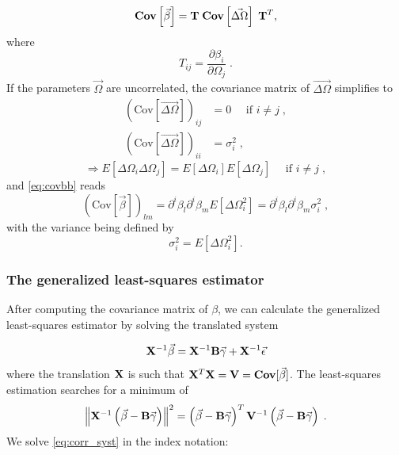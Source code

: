 \begin{equation}\label{key}
\mathbf{Cov}\left[\vec{\beta}\right] = \mathbf{T}\; \mathbf{Cov}\left[\vec{\Delta\Omega}\right] \;\mathbf{T}^T,
\end{equation} where 
\begin{equation}\label{key}
T_{ij} = \frac{\partial \beta_i}{\partial \Omega_j}\;.
\end{equation}
If the parameters $ \vec{\Omega} $ are uncorrelated, the covariance matrix of $\vec{ \Delta\Omega} $ simplifies to
\begin{align}\label{key}
\left(\text{Cov}\left[\vec{\Delta\Omega}\right] \right)_{ij}&= 0 \quad  \text{ if } i\neq j \;,\\
 \left(\text{Cov}\left[\vec{\Delta\Omega}\right] \right)_{ii}&= \sigma_i^2\;,
\end{align} 
\begin{equation}\label{key}
\Rightarrow E\left[\Delta\Omega_i\Delta\Omega_j\right] = E\left[\Delta\Omega_i\right]E\left[\Delta\Omega_j\right]\quad \text{ if } i \neq j\;,
\end{equation}
and \eqref{eq:covbb} reads
\begin{equation}\label{key}
(\text{Cov}[\vec{\beta}])_{lm} = \partial^i\beta_l\partial^i\beta_mE[\Delta\Omega_i^2] = \partial^i\beta_l\partial^i\beta_m \sigma_i^2\;,
\end{equation}
with the variance being defined by
\begin{equation}\label{key}
\sigma_i^2 = E\left[\Delta\Omega_i^2\right].
\end{equation}

\subsubsection{The generalized least-squares estimator}

After computing the covariance matrix of $ \beta $, we can calculate the generalized least-squares estimator by solving the translated system

\begin{equation}
\mathbf{X}^{-1} \vec{\beta} = \mathbf{X}^{-1}\mathbf{B}\vec{\gamma} + \mathbf{X}^{-1}\vec{\epsilon}
\end{equation}
where the translation $ \mathbf{X} $ is such that $ \mathbf{X}^T\mathbf{X} = \mathbf{V} = \mathbf{Cov}[\vec{\beta}] $. The least-squares estimation searches for a minimum of 
\begin{equation}
\left\|\mathbf{X}^{-1}\left(\vec{\beta} - \mathbf{B}\vec{\gamma}\right)\right\|^2 = \left(\vec{\beta} - \mathbf{B}\vec{\gamma}\right)^T \mathbf{V}^{-1}\left(\vec{\beta} - \mathbf{B}\vec{\gamma}\right)\;.
\label{eq:corr_syst}
\end{equation} %
We solve \eqref{eq:corr_syst} in the index notation:

